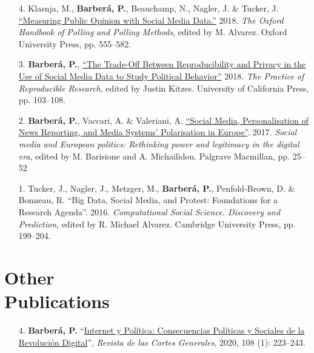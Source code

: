 \documentclass[margin,line,11pt]{resume}
\begin{document}
\begin{resume}
\begin{itemize}[leftmargin=5.5mm]
\item[4.] Klasnja, M., \textbf{Barber\'{a}, P.}, Beauchamp, N., Nagler, J. \& Tucker, J. \href{http://www.oxfordhandbooks.com/view/10.1093/oxfordhb/9780190213299.001.0001/oxfordhb-9780190213299-e-3}{``Measuring Public Opinion with Social Media Data.''} 2018. \textit{The Oxford Handbook of Polling and Polling Methods}, edited by M. Alvarez. Oxford University Press, pp. 555--582.

\item[3.] \textbf{Barber\'{a}, P.}, \href{https://www.practicereproducibleresearch.org/case-studies/barbera.html}{``The Trade-Off Between Reproducibility and Privacy in the Use of Social Media Data to Study Political Behavior''} 2018. \textit{The Practice of Reproducible Research}, edited by Justin Kitzes. University of California Press, pp. 103--108. 

\item[2.] \textbf{Barber\'{a}, P.}, Vaccari, A. \& Valeriani, A. \href{https://link.springer.com/chapter/10.1057/978-1-137-59890-5_2}{``Social Media, Personalisation of News Reporting, and Media Systems' Polarisation in Europe''}. 2017. \textit{Social media and European politics: Rethinking power and legitimacy in the digital era}, edited by M. Barisione and A. Michailidou. Palgrave Macmillan, pp. 25--52

\item[1.] Tucker, J., Nagler, J., Metzger, M., \textbf{Barber\'{a}, P.}, Penfold-Brown, D. \& Bonneau, R. ``Big Data, Social Media, and Protest: Foundations for a Research Agenda''. 2016. \textit{Computational Social Science. Discovery and Prediction}, edited by R. Michael Alvarez. Cambridge University Press, pp. 199--204.
\end{itemize}


\section{\mysidestyle Other\\Publications}
    \vspace{.15cm}    
\begin{itemize}[leftmargin=5.5mm]
\item[4.] \textbf{Barber\'{a}, P.} ``\href{https://revista.cortesgenerales.es/rcg/article/view/1486}{Internet y Pol\'{i}tica: Consecuencias Pol\'{i}ticas y Sociales de la Revoluci\'{o}n Digital}'', \textit{Revista de las Cortes Generales}, 2020, 108 (1): 223--243.


\end{itemize}
\end{resume}
\end{document}
